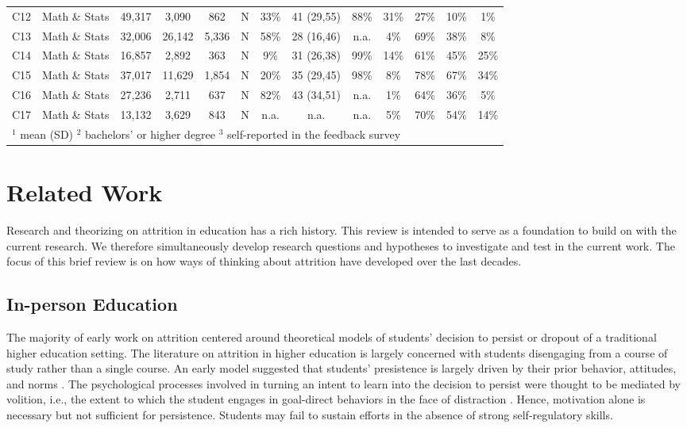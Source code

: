 \documentclass{sigchi}\usepackage[]{graphicx}\usepackage[]{color}
\begin{document}
\begin{table}[th]
\begin{tabular}{llccccccccccc}
C12 & Math \& Stats & 49,317 & 3,090 & 862   & N    & 33\%   & 41 (29,55) & 88\%       & 31\% & 27\% & 10\% & 1\% \\
C13 & Math \& Stats & 32,006 & 26,142 & 5,336 & N   & 58\%   & 28 (16,46) & n.a.       & 4\%  & 69\% & 38\% & 8\% \\
C14 & Math \& Stats & 16,857 & 2,892 & 363   & N    & 9\%    & 31 (26,38) & 99\%       & 14\% & 61\% & 45\% & 25\% \\
C15 & Math \& Stats & 37,017 & 11,629 & 1,854 & N   & 20\%   & 35 (29,45) & 98\%       & 8\%  & 78\% & 67\% & 34\% \\
C16 & Math \& Stats & 27,236 & 2,711 & 637   & N    & 82\%   & 43 (34,51) & n.a.       & 1\%  & 64\% & 36\% & 5\% \\
C17 & Math \& Stats & 13,132 & 3,629 & 843   & N    & n.a.   & n.a.       & n.a.       & 5\%  & 70\% & 54\% & 14\% \\
\bottomrule
\multicolumn{13}{l}{$^1$ mean (SD)  $^2$ bachelors' or higher degree  $^3$ self-reported in the feedback survey}
\end{tabular}
\end{table}


\section{Related Work}

Research and theorizing on attrition in education has a rich history. This review is intended to serve as a foundation to build on with the current research. We therefore simultaneously develop research questions and hypotheses to investigate and test in the current work. The focus of this brief review is on how ways of thinking about attrition have developed over the last decades. 

\subsection{In-person Education}

The majority of early work on attrition centered around theoretical models of students' decision to persist or dropout of a traditional higher education setting. The literature on attrition in higher education is largely concerned with students disengaging from a course of study rather than a single course. An early model suggested that students' presistence is largely driven by their prior behavior, attitudes, and norms \cite{fishbein1975belief}. The psychological processes involved in turning an intent to learn into the decision to persist were thought to be mediated by volition, i.e., the extent to which the student engages in goal-direct behaviors in the face of distraction \cite{corno1993role}. Hence, motivation alone is necessary but not sufficient for persistence. Students may fail to sustain efforts in the absence of strong self-regulatory skills.
\end{document}
